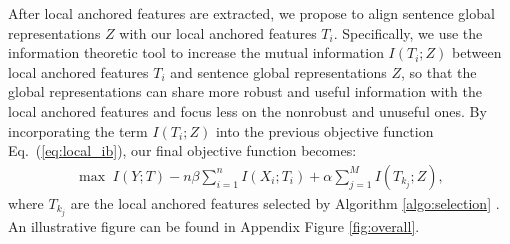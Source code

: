 \documentclass{article} \usepackage{iclr2021_conference,times}
\theoremstyle{definition}
\theoremstyle{remark}
\newcommand{\modified}[1]{{\color{black}{#1}}}
\begin{document}
After local anchored features are extracted, we propose to align sentence global representations $Z$ with our local anchored features $T_i$. \modified{In practice, we can use the final-layer [CLS] embedding to represent global sentence-level feature $Z$.} Specifically, we use the information theoretic tool to increase the mutual information $I(T_i; Z)$ between local anchored features $T_i$ and sentence global representations $Z$, so that the global representations can share more robust and useful information with the local anchored features and focus less on the nonrobust and unuseful ones. By incorporating the term $I(T_i; Z)$ into the previous objective function Eq.~(\ref{eq:local_ib}), our final objective function becomes: 
\begin{align}
    \label{eq:complete}
   \max \; I(Y; T) - n \beta \sum_{i=1}^{n} I(X_i; T_i) + \alpha \sum_{j=1}^M I(T_{k_j}; Z), 
\end{align}
where $T_{k_j}$ are the local anchored features selected by Algorithm \ref{algo:selection} \modified{and $M$ is the number of local anchored features}. An illustrative figure can be found in Appendix Figure \ref{fig:overall}.
\end{document}
